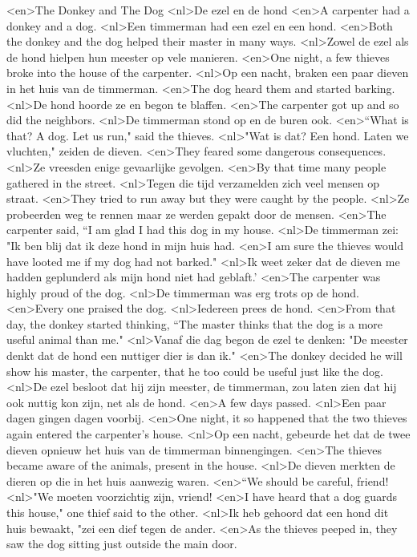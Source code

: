 <en>The Donkey and The Dog
<nl>De ezel en de hond
<en>A carpenter had a donkey and a dog.
<nl>Een timmerman had een ezel en een hond.
<en>Both the donkey and the dog helped their master in many ways.
<nl>Zowel de ezel als de hond hielpen hun meester op vele manieren.
<en>One night, a few thieves broke into the house of the carpenter.
<nl>Op een nacht, braken een paar dieven in het huis van de timmerman.
<en>The dog heard them and started barking.
<nl>De hond hoorde ze en begon te blaffen.
<en>The carpenter got up and so did the neighbors.
<nl>De timmerman stond op en de buren ook.
<en>“What is that? A dog. Let us run," said the thieves.
<nl>"Wat is dat? Een hond. Laten we vluchten," zeiden de dieven.
<en>They feared some dangerous consequences.
<nl>Ze vreesden enige gevaarlijke gevolgen.
<en>By that time many people gathered in the street.
<nl>Tegen die tijd verzamelden zich veel mensen op straat.
<en>They tried to run away but they were caught by the people.
<nl>Ze probeerden weg te rennen maar ze werden gepakt door de mensen.
<en>The carpenter said, “I am glad I had this dog in my house.
<nl>De timmerman zei: "Ik ben blij dat ik deze hond in mijn huis had.
<en>I am sure the thieves would have looted me if my dog had not barked."
<nl>Ik weet zeker dat de dieven me hadden geplunderd als mijn hond niet had geblaft.'
<en>The carpenter was highly proud of the dog.
<nl>De timmerman was erg trots op de hond.
<en>Every one praised the dog.
<nl>Iedereen prees de hond.
<en>From that day, the donkey started thinking, “The master thinks that the dog is a more useful animal than me."
<nl>Vanaf die dag begon de ezel te denken: "De meester denkt dat de hond een nuttiger dier is dan ik."
<en>The donkey decided he will show his master, the carpenter, that he too could be useful just like the dog.
<nl>De ezel besloot dat hij zijn meester, de timmerman, zou laten zien dat hij ook nuttig kon zijn, net als de hond.
<en>A few days passed.
<nl>Een paar dagen gingen dagen voorbij.
<en>One night, it so happened that the two thieves again entered the carpenter’s house.
<nl>Op een nacht, gebeurde het dat de twee dieven opnieuw het huis van de timmerman binnengingen.
<en>The thieves became aware of the animals, present in the house.
<nl>De dieven merkten de dieren op die in het huis aanwezig waren.
<en>“We should be careful, friend!
<nl>"We moeten voorzichtig zijn, vriend!
<en>I have heard that a dog guards this house," one thief said to the other.
<nl>Ik heb gehoord dat een hond dit huis bewaakt, "zei een dief tegen de ander.
<en>As the thieves peeped in, they saw the dog sitting just outside the main door.
